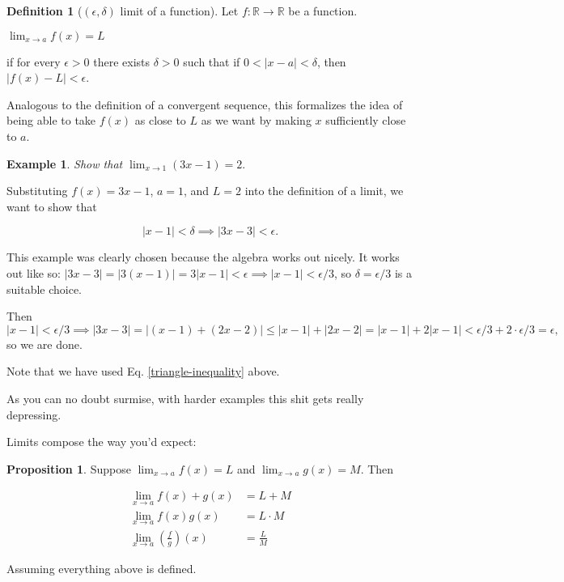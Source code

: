\documentclass{article}
\theoremstyle{definition}
\newtheorem{definition}{Definition}[section]
\newtheorem{example}{Example}[section]
\newtheorem{proposition}{Proposition}[section]
\begin{document}
\begin{definition}[$(\epsilon, \delta)$ limit of a function]

Let $f: \mathbb{R} \to \mathbb{R}$ be a function. 

\begin{center}
$\lim_{x \to a} f(x) = L$
\end{center}

if for every $\epsilon > 0$ there exists $\delta > 0$ such that if $0 < |x-a| <
\delta$, then $|f(x) - L| < \epsilon$.
 
\end{definition}

Analogous to the definition of a convergent sequence, this formalizes the idea of being able to take $f(x)$ as close to $L$ as we want
by making $x$ sufficiently close to $a$.

\begin{example} 

\emph{Show that $\lim_{x \to 1} (3x-1) = 2$}.

Substituting $f(x) = 3x-1$, $a = 1$, and $L = 2$ into the definition of a limit,
we want to show that

\begin{equation}
|x - 1| < \delta \implies |3x - 3| < \epsilon.
\end{equation}

This example was clearly chosen because the algebra works out nicely. It
works out like so: $|3x-3| = |3(x-1)| = 3|x-1| < \epsilon \implies |x-1| <
\epsilon/3$, so $\delta = \epsilon/3$ is a suitable choice.

Then $|x - 1| < \epsilon/3 \implies |3x-3| = |(x - 1) + (2x-2)| \leq |x-1| +
|2x-2| = |x-1| + 2|x-1| < \epsilon/3 + 2 \cdot \epsilon/3 = \epsilon,$ so we are
done.

Note that we have used Eq. \ref{triangle-inequality} above.
 
\end{example}

As you can no doubt surmise, with harder examples this shit gets really depressing.

Limits compose the way you'd expect:
\begin{proposition}
Suppose $\lim_{x \to a} f(x) = L$ and $\lim_{x \to a} g(x) = M$. Then

\begin{align}
\lim_{x \to a} f(x) + g(x) & = L + M \\
\lim_{x \to a} f(x)g(x) & = L \cdot M \\
\lim_{x \to a} \left(\frac{f}{g}\right)(x) & = \frac{L}{M}
\end{align}

Assuming everything above is defined.

\end{proposition}
\end{document}
